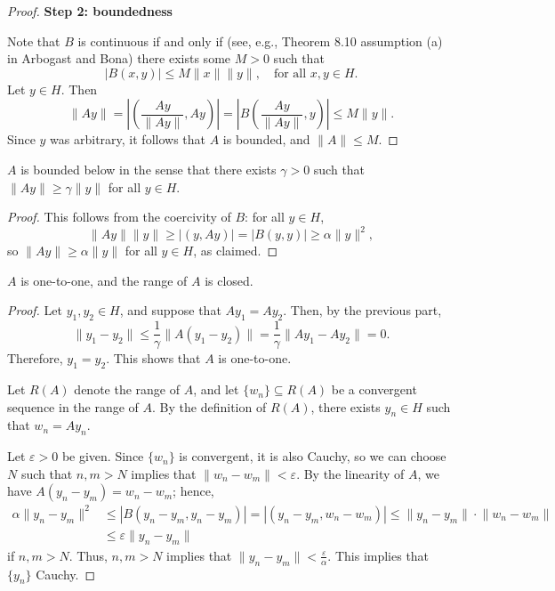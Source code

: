 \documentclass{homework}
\begin{document}
\begin{arabicparts}
\begin{proof}
			\textbf{Step 2: boundedness}
			
			Note that $B$ is continuous if and only if (see, e.g., Theorem 8.10 assumption (a) in Arbogast and Bona) there exists some $M > 0$ such that
			\begin{equation}
				|B(x,y)| \le M\lVert x\rVert \lVert y\rVert, \quad \text{for all } x, y\in H.
			\end{equation}
			Let $y \in H$. Then
			\begin{equation}
				\lVert Ay\rVert = \left|\left(\frac{Ay}{\lVert Ay\rVert}, Ay\right)\right|=\left|B\left(\frac{Ay}{\lVert Ay\rVert},y \right)\right| \le M \lVert y\rVert.
			\end{equation}
			Since $y$ was arbitrary, it follows that $A$ is bounded, and $\lVert A \rVert \le M$.
		\end{proof}
		
		\questionpart
		$A$ is bounded below in the sense that there exists $\gamma > 0$ such that $\lVert A y\rVert \ge \gamma \lVert y\rVert$ for all $y \in H$.
		\begin{proof}
			This follows from the coercivity of $B$: for all $y \in H$,
			\begin{equation}
				\lVert Ay\rVert \lVert y\rVert \ge |(y, Ay)| = |B(y, y)| \ge \alpha \lVert y \rVert^2,
			\end{equation}
			so $\lVert Ay\rVert \ge \alpha \lVert y\rVert$ for all $y \in H$, as claimed.
		\end{proof}
		
		\questionpart
		$A$ is one-to-one, and the range of $A$ is closed.
		\begin{proof}
			Let $y_1, y_2 \in H$, and suppose that $Ay_1 = Ay_2$. Then, by the previous part,
			\begin{equation}
				\lVert y_1 - y_2\rVert \le \frac{1}{\gamma}\lVert A(y_1 - y_2)\rVert = \frac{1}{\gamma}\lVert Ay_1 - Ay_2\rVert = 0.
			\end{equation}
			Therefore, $y_1 = y_2$. This shows that $A$ is one-to-one.
			
			Let $R(A)$ denote the range of $A$, and let $\{w_n\} \subseteq R(A)$ be a convergent sequence in the range of $A$. By the definition of $R(A)$, there exists $y_n \in H$ such that $w_n = Ay_n$.
			
			Let $\varepsilon > 0$ be given. Since $\{w_n\}$ is convergent, it is also Cauchy, so we can choose $N$ such that $n,m > N$ implies that $\lVert w_n - w_m\rVert < \varepsilon$. By the linearity of $A$, we have $A(y_n-y_m) = w_n-w_m$; hence,
			\begin{align}
				\alpha \lVert y_n-y_m\rVert^2 &\le |B(y_n-y_m,y_n-y_m)| = |(y_n-y_m,w_n-w_m)|\le \lVert y_n-y_m\rVert\cdot \lVert w_n - w_m\rVert \\
				&\le \varepsilon\lVert y_n-y_m\rVert
			\end{align}
			if $n,m > N$. Thus, $n,m >N$ implies that $\lVert y_n - y_m\rVert < \frac{\varepsilon}{\alpha}$. This implies that  $\{y_n\}$ Cauchy.
			

\end{proof}
\end{arabicparts}
\end{document}
